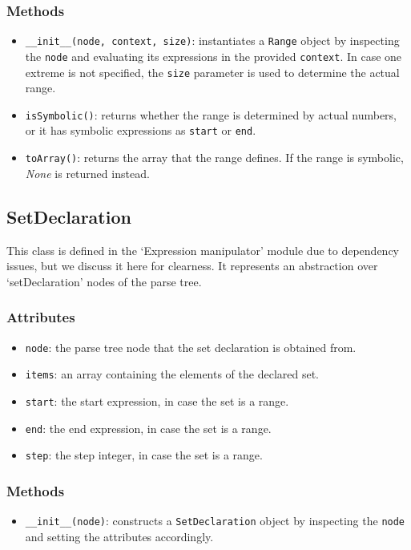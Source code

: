\documentclass[12pt,a4paper]{report}
\theoremstyle{definition}
\theoremstyle{definition}
\theoremstyle{definition}
\begin{document}
\subsubsection{Methods}
\begin{itemize}
    \itemsep 0em
    \item \texttt{\_\_init\_\_(node, context, size)}: instantiates a \texttt{Range} object by inspecting the \texttt{node} and evaluating its expressions in the provided \texttt{context}. In case one extreme is not specified, the \texttt{size} parameter is used to determine the actual range.
    \item \texttt{isSymbolic()}: returns whether the range is determined by actual numbers, or it has symbolic expressions as \texttt{start} or \texttt{end}.
    \item \texttt{toArray()}: returns the array that the range defines. If the range is symbolic, \textit{None} is returned instead.
\end{itemize}


\subsection{SetDeclaration}
This class is defined in the `Expression manipulator' module due to dependency issues, but we discuss it here for clearness. It represents an abstraction over `setDeclaration' nodes of the parse tree.
\subsubsection{Attributes}
\begin{itemize}
    \itemsep 0em
    \item \texttt{node}: the parse tree node that the set declaration is obtained from.
    \item \texttt{items}: an array containing the elements of the declared set.
    \item \texttt{start}: the start expression, in case the set is a range.
    \item \texttt{end}: the end expression, in case the set is a range.
    \item \texttt{step}: the step integer, in case the set is a range.
\end{itemize}
\subsubsection{Methods}
\begin{itemize}
    \itemsep 0em
    \item \texttt{\_\_init\_\_(node)}: constructs a \texttt{SetDeclaration} object by inspecting the \texttt{node} and setting the attributes accordingly.
\end{itemize}
\end{document}
